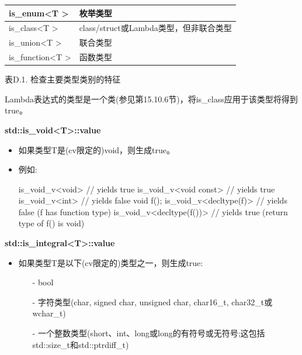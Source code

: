 \begin{table}[H]
\begin{tabular}{|l|l|}
		is\_enum\textless{}T \textgreater{}                      & 枚举类型                                                                         \\ \hline
		is\_class\textless{}T \textgreater{}                     & class/struct或Lambda类型，但非联合类型                                                               \\ \hline
		is\_union\textless{}T \textgreater{}                     & 联合类型                                                                                                    \\ \hline
		is\_function\textless{}T \textgreater{}                  & 函数类型                                                                                                  \\ \hline
	\end{tabular}
\end{table}

\begin{center}
表D.1. 检查主要类型类别的特征
\end{center}

Lambda表达式的类型是一个类(参见第15.10.6节)，将is\_class应用于该类型将得到true。

\textbf{std::is\_void<T>::value}

\begin{itemize}
\item 
如果类型T是(cv限定的)void，则生成true。

\item 
例如:
\begin{cpp}
is_void_v<void> // yields true
is_void_v<void const> // yields true
is_void_v<int> // yields false
void f();
is_void_v<decltype(f)> // yields false (f has function type)
is_void_v<decltype(f())> // yields true (return type of f() is void)
\end{cpp}

\end{itemize}

\textbf{std::is\_integral<T>::value}

\begin{itemize}
\item 
如果类型T是以下(cv限定的)类型之一，则生成true:

\begin{itemize}
\item [-]
bool

\item [-]
字符类型(char, signed char, unsigned char, char16\_t, char32\_t或wchar\_t)

\item [-]
一个整数类型(short、int、long或long的有符号或无符号;这包括std::size\_t和std::ptrdiff\_t)
\end{itemize}

\end{itemize}

